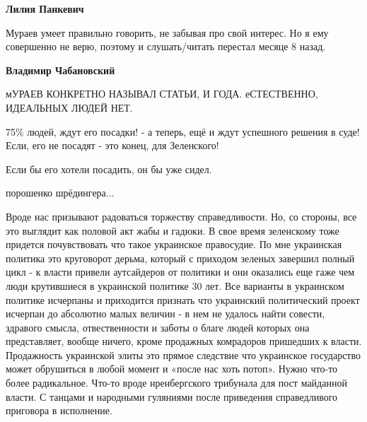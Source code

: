 \begin{itemize}
\begin{itemize}
\textbf{Лилия Панкевич} 

Мураев умеет правильно говорить, не забывая про свой интерес. Но я ему
совершенно не верю, поэтому и слушать/читать перестал месяце 8 назад.

\textbf{Владимир Чабановский} 

мУРАЕВ КОНКРЕТНО НАЗЫВАЛ СТАТЬИ, И ГОДА. еСТЕСТВЕННО, ИДЕАЛЬНЫХ ЛЮДЕЙ НЕТ.

\end{itemize} %

75\% людей, ждут его посадки! - а теперь, ещё и ждут успешного решения в суде!
Если, его не посадят - это конец, для Зеленского!

Если бы его хотели посадить, он бы уже сидел.


порошенко шрёдингера...


Вроде нас призывают радоваться торжеству справедливости. Но, со стороны, все
это выглядит как половой акт жабы и гадюки. В свое время зеленскому тоже
придется почувствовать что такое украинское правосудие. По мне украинская
политика это круговорот дерьма, который с приходом зеленых завершил полный
цикл - к власти привели аутсайдеров от политики и они оказались еще гаже чем
люди крутившиеся в украинской политике 30 лет. Все варианты в украинском
политике исчерпаны и приходится признать что украинский политический проект
исчерпан до абсолютно малых величин - в нем не удалось найти совести, здравого
смысла, отвественности и заботы о благе людей которых она представляет,
вообще ничего, кроме продажных комрадоров пришедших к власти. Продажность
украинской элиты это прямое следствие что украинское государство может
обрушиться в любой момент и «после нас хоть потоп». Нужно что-то более
радикальное. Что-то вроде нренбергского трибунала для пост майданной власти. С
танцами и народными гуляниями после приведения справедливого приговора в
исполнение.



\end{itemize} %
